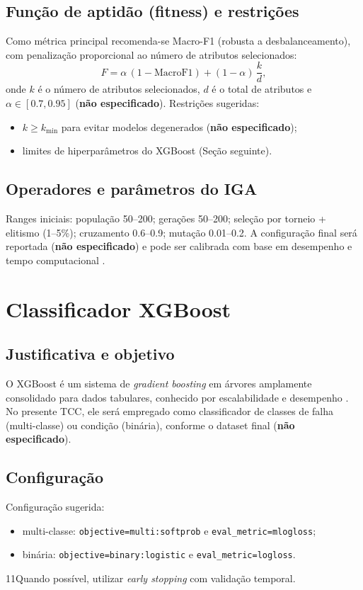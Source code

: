 \subsection{Função de aptidão (fitness) e restrições}
Como métrica principal recomenda-se Macro-F1 (robusta a desbalanceamento),
com penalização proporcional ao número de atributos selecionados:
$$
F = \alpha\,(1-\text{MacroF1}) + (1-\alpha)\,\frac{k}{d},
$$
onde $k$ é o número de atributos selecionados, $d$ é o total de
atributos e $\alpha \in [0.7,0.95]$ (\textbf{não especificado}).
Restrições sugeridas:
\begin{itemize}
\item $k \ge k_{\min}$ para evitar modelos degenerados (\textbf{não
especificado});
\item limites de hiperparâmetros do XGBoost (Seção seguinte).
\end{itemize}

\subsection{Operadores e parâmetros do IGA}
Ranges iniciais:
população 50--200; gerações 50--200; seleção por torneio +
elitismo (1--5\%);
cruzamento 0.6--0.9; mutação 0.01--0.2.
A configuração final será reportada (\textbf{não especificado}) e
pode ser calibrada com base em desempenho e tempo computacional
\cite{wu2021_iga_xgboost}.

\section{Classificador XGBoost}
\subsection{Justificativa e objetivo}
O XGBoost é um sistema de \textit{gradient boosting} em árvores
amplamente consolidado para dados tabulares, conhecido por escalabilidade e
desempenho \cite{chen2016_xgboost}.
No presente TCC, ele será empregado como classificador de classes de falha
(multi-classe) ou condição (binária), conforme o dataset final
(\textbf{não especificado}).

\subsection{Configuração}
Configuração sugerida:
\begin{itemize}
\item multi-classe: \texttt{objective=multi:softprob} e
\texttt{eval\_metric=mlogloss};
\item binária: \texttt{objective=binary:logistic} e
\texttt{eval\_metric=logloss}.
\end{itemize}
11Quando possível, utilizar \textit{early stopping} com validação
temporal.

